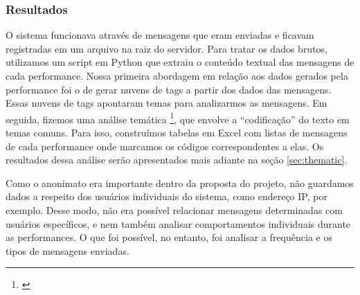 \newpage

\subsubsection{Resultados}
O sistema funcionava através de mensagens que eram enviadas e ficavam registradas em um arquivo na raiz do servidor. Para tratar os dados brutos, utilizamos um script em Python que extraiu o conteúdo textual das mensagens de cada performance. Nossa primeira abordagem em relação aos dados gerados pela performance foi o de gerar nuvens de tags a partir dos dados das mensagens. Essas nuvens de tags apontaram temas para analizarmos as mensagens. Em seguida, fizemos uma análise temática \footnote{\cite{Braun2006}}, que envolve a ``codificação'' do texto em temas comuns. Para isso, construímos tabelas em Excel com listas de mensagens de cada performance onde marcamos os códigos correspondentes a elas. Os resultados dessa análise serão apresentados mais adiante na seção \ref{sec:thematic}. 


Como o anonimato era importante dentro da proposta do projeto, não guardamos dados a respeito dos usuários individuais do sistema, como endereço IP, por exemplo. Desse modo, não era possível relacionar mensagens determinadas com usuários específicos, e nem também analisar comportamentos individuais durante as performances. O que foi possível, no entanto, foi analisar a frequência e os tipos de mensagens enviadas.


